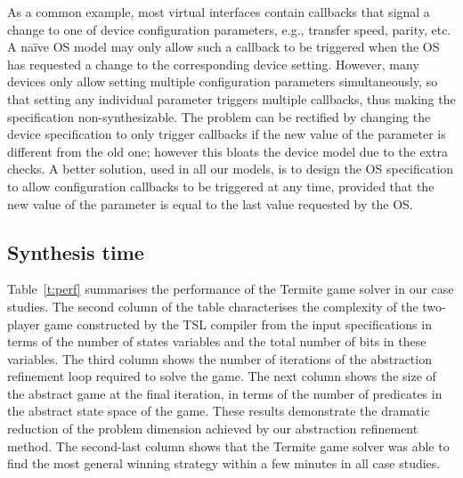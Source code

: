 \documentclass[a4paper,twoside,openright,11pt]{book}
\newcommand{\termite}{Termite\xspace}
\newcommand{\tsl}{TSL\xspace}
\theoremstyle{definition}
\begin{document}
As a common example, most virtual interfaces contain callbacks that signal a change to one of device configuration parameters, e.g., transfer speed, parity, etc.  A na\"ive OS model may only allow such a callback to be triggered when the OS has requested a change to the corresponding device setting.  However, many devices only allow setting multiple configuration parameters simultaneously, so that setting any individual parameter triggers multiple callbacks, thus making the specification non-synthesizable.  The problem can be rectified by changing the device specification to only trigger callbacks if the new value of the parameter is different from the old one; however this bloats the device model due to the extra checks.  A better solution, used in all our models, is to design the OS specification to allow configuration callbacks to be triggered at any time, provided that the new value of the parameter is equal to the last value requested by the OS. 

\subsection{Synthesis time} 
Table~\ref{t:perf} summarises the performance of the \termite game solver in our case studies.  The second column of the table characterises the complexity of the two-player game constructed by the \tsl compiler from the input specifications in terms of the number of states variables and the total number of bits in these variables.  The third column shows the number of iterations of the abstraction refinement loop required to solve the game.  The next column shows the size of the abstract game at the final iteration, in terms of the number of predicates in the abstract state space of the game.  These results demonstrate the dramatic reduction of the problem dimension achieved by our abstraction refinement method.  The second-last column shows that the \termite game solver was able to find the most general winning strategy within a few minutes in all case studies.
\end{document}
